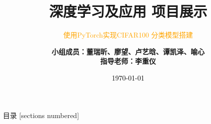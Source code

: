 \documentclass[10pt]{beamer}
\title{\bfseries 深度学习及应用 项目展示}
\subtitle{\textcolor{orange}{使用PyTorch实现CIFAR100 分类模型搭建}}
\date{\textcolor{black}{\today}}
\author{\bf
小组成员：董瑞昕、廖望、卢艺晗、谭凯泽、喻心\\
指导老师：李重仪
}
\institute{\textcolor{verde}{深度学习及应用 - 2025年春季学期}}
\begin{document}
\maketitle

\begin{frame}{目录}
\hypersetup{linkcolor=black}
[sections numbered]
\tableofcontents
\end{frame}





\end{document}
